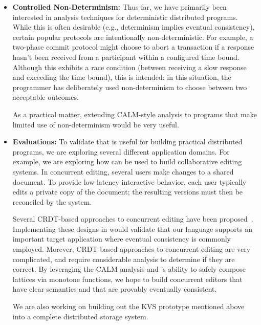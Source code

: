 \begin{itemize}
\item \textbf{Controlled Non-Determinism:} Thus far, we have primarily been
  interested in analysis techniques for deterministic distributed
  programs. While this is often desirable (e.g., determinism implies eventual
  consistency), certain popular protocols are intentionally
  non-deterministic. For example, a two-phase commit protocol might choose to
  abort a transaction if a response hasn't been received from a participant
  within a configured time bound. Although this exhibits a race condition
  (between receiving a slow response and exceeding the time bound), this is
  intended: in this situation, the programmer has deliberately used
  non-determinism to choose between two acceptable outcomes. 

  As a practical matter, extending CALM-style analysis to programs that make
  limited use of non-determinism would be very useful.

\item \textbf{Evaluations:} To validate that \blooml is useful for building
  practical distributed programs, we are exploring several different application
  domains. For example, we are exploring how \blooml can be used to build
  collaborative editing systems. In concurrent editing, several users make
  changes to a shared document. To provide low-latency interactive behavior,
  each user typically edits a private copy of the document; the resulting
  versions must then be reconciled by the system.

  Several CRDT-based approaches to concurrent editing have been
  proposed~\cite{Oster2006,Preguica2009,Weiss2009,Weiss2010}. Implementing these designs
  in \blooml would validate that our language supports an important target
  application where eventual consistency is commonly employed. Morever,
  CRDT-based approaches to concurrent editing are very complicated, and require
  considerable analysis to determine if they are correct. By leveraging the CALM
  analysis and \blooml's ability to safely compose lattices via monotone
  functions, we hope to build concurrent editors that have clear semantics and
  that are provably eventually consistent.

  We are also working on building out the KVS prototype mentioned above into a
  complete distributed storage system.  
\end{itemize}

